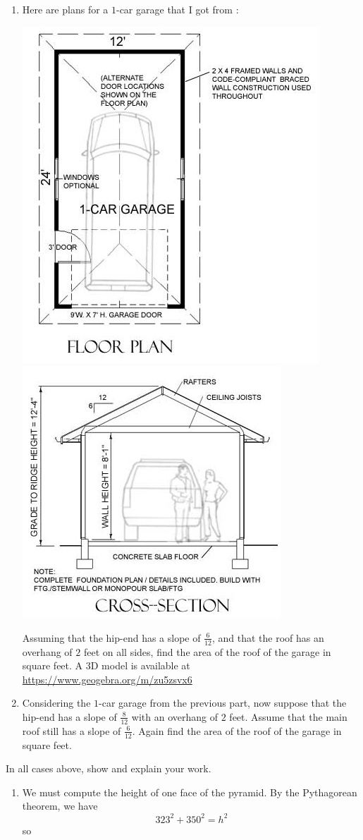 \documentclass[hints,nooutcomes,noauthor,handout]{ximera}
\begin{document}
 \begin{question}
\begin{enumerate}
\item Here are plans for a $1$-car garage that I got from :
   \begin{center}
     \includegraphics[width=.4\textwidth]{oneCarGarage.jpeg}
    \includegraphics[width=.35\textwidth]{oneCarGarageFront.jpeg}
   \end{center}
   Assuming that the hip-end has a slope of $\tfrac{6}{12}$, and that
   the roof has an overhang of $2$ feet on all sides, find the area of
   the roof of the garage in square feet. A 3D model is available at \url{https://www.geogebra.org/m/zu5zsvx6}
 \item Considering the $1$-car garage from the previous part, now
   suppose that the hip-end has a slope of $\tfrac{8}{12}$ with an
   overhang of $2$ feet. Assume that the main roof still has a slope of $\tfrac{6}{12}$. Again find the area of the roof of the
   garage in square feet.
\end{enumerate}
In all cases above, show and explain your work.
\begin{freeResponse}
  \begin{enumerate}
    \item We must compute the height of one face of the pyramid. By
      the Pythagorean theorem, we have
      \[
      323^2 + 350^2 = h^2
      \]
      so
      \[
\]
\end{enumerate}
\end{freeResponse}
\end{question}
\end{document}
